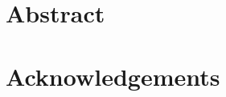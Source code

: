 \documentclass[11pt]{report}
\begin{document}
\chapter*{Abstract}
\label{sec:abstract}

\chapter*{Acknowledgements}
\label{sec:acknowledgements}
\end{document}
